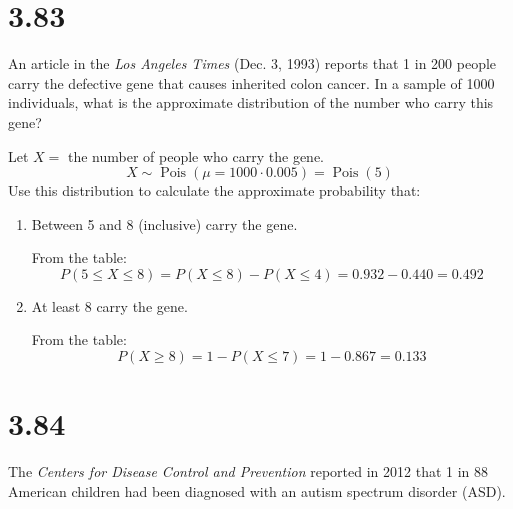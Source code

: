 \documentclass[letterpaper,12pt,fleqn]{article}
\DeclareMathOperator{\pois}{Pois}
\begin{document}
\section*{3.83}

An article in the \emph{Los Angeles Times} (Dec. 3, 1993) reports that 1 in 200 people carry the defective gene that causes
inherited colon cancer.  In a sample of 1000 individuals, what is the approximate distribution of the number who carry this
gene?

Let \(X=\) the number of people who carry the gene.
\[X\sim\pois(\mu=1000\cdot0.005)=\pois(5)\]
Use this distribution to calculate the approximate probability that:
\begin{enumerate}[label={\alph*)}]
\item Between 5 and 8 (inclusive) carry the gene.

  From the table:
  \[P(5\le X\le8)=P(X\le8)-P(X\le4)=0.932-0.440=0.492\]

\item At least 8 carry the gene.
  
  From the table:
  \[P(X\ge8)=1-P(X\le7)=1-0.867=0.133\]
\end{enumerate}

\section*{3.84}

The \emph{Centers for Disease Control and Prevention} reported in 2012 that 1 in 88 American children had been diagnosed
with an autism spectrum disorder (ASD).
\end{document}
